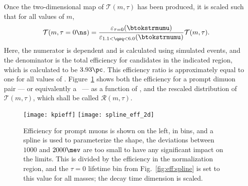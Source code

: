 Once the two-dimensional map of $\mathcal{T}(m,\tau)$ has been produced, it is scaled such that
for all values of $m$,
\begin{equation}
  \mathcal{T}(m,\tau=0\ns) =
  \frac{
    \varepsilon_{\tau=0}(\btokstrmumu)
  }{
    \varepsilon_{1.1<\qsq<6.0}(\btokstrmumu)
  }
  \mathcal{T}(m,\tau).
\end{equation}
Here, the numerator is \qsq dependent and is calculated using
simulated events, and the denominator is the total
efficiency for candidates in the indicated \qsq region, which is calculated to be $3.93\pc$.
This efficiency ratio is approximately equal to one for all values of \mass{\db}.
Figure~\ref{fig:eff:effmap} shows both the efficiency for a prompt dimuon pair --- or equivalently
a \db\ --- as a function of \qsq, and the rescaled distribution of $\mathcal{T}(m,\tau)$, which
shall
be called $\mathcal{R}(m,\tau)$.

\begin{figure}
  \begin{center}
    \texttt{[image: kpieff]}
    \texttt{[image: spline\_eff\_2d]}
    \caption[Relative efficiency map]
    {
      Efficiency \btokstrmumu for prompt muons is shown on the left, in bins, and a spline is used
      to parameterize the shape, the deviations between $1000$ and $2000\mev$ are too small to have
      any significant impact on the limits.
      This is divided by the efficiency in the normalization region, and the $\tau=0$ lifetime bin
      from Fig.~\ref{fig:eff:spline} is set to this value for all masses; the decay time dimension
      is scaled.
    }
    \label{fig:eff:effmap}
  \end{center}
\end{figure}



